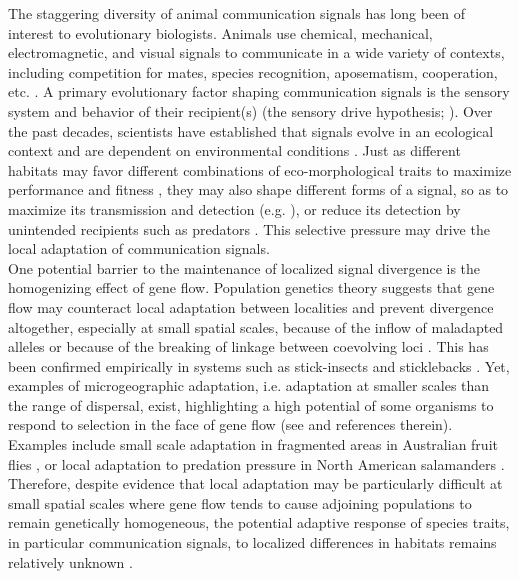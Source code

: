
The staggering diversity of animal communication signals has long been of interest to evolutionary biologists. Animals use chemical, mechanical, electromagnetic, and visual signals to communicate in a wide variety of contexts, including competition for mates, species recognition, aposematism, cooperation, etc. \citep{Bradbury2011}. A primary evolutionary factor shaping communication signals is the sensory system and behavior of their recipient(s) (the sensory drive hypothesis; \citealt{Endler1988,Endler1992,Endler1998}). Over the past decades, scientists have established that signals evolve in an ecological context and are dependent on environmental conditions \citep{Endler1992,Endler1993,Endler1993a}. Just as different habitats may favor different combinations of eco-morphological traits to maximize performance and fitness \citep{Arnold1983}, they may also shape different forms of a signal, so as to maximize its transmission and detection (e.g. \citealt{Seehausen1997}), or reduce its detection by unintended recipients such as predators \citep{Endler1984,Endler1990,Endler1991,Halfwerk2014}. This selective pressure may drive the local adaptation of communication signals.\\


One potential barrier to the maintenance of localized signal divergence is the homogenizing effect of gene flow. Population genetics theory suggests that gene flow may counteract local adaptation between localities and prevent divergence altogether, especially at small spatial scales, because of the inflow of maladapted alleles or because of the breaking of linkage between coevolving loci \citep{Felsenstein1976, Garcia-Ramos1997, Dieckmann1999, Lenormand2002, Hendry2007}. This has been confirmed empirically in systems such as stick-insects \citep{Nosil2004} and sticklebacks \citep{Hendry2007a}. Yet, examples of microgeographic adaptation, i.e. adaptation at smaller scales than the range of dispersal, exist, highlighting a high potential of some organisms to respond to selection in the face of gene flow (see \citealt{Richardson2014} and references therein). Examples include small scale adaptation in fragmented areas in Australian fruit flies \citep{Willi2012}, or local adaptation to predation pressure in North American salamanders \citep{Richardson2013}. Therefore, despite evidence that local adaptation may be particularly difficult at small spatial scales where gene flow tends to cause adjoining populations to remain genetically homogeneous, the potential adaptive response of species traits, in particular communication signals, to localized differences in habitats remains relatively unknown \citep{Richardson2014}.\\

